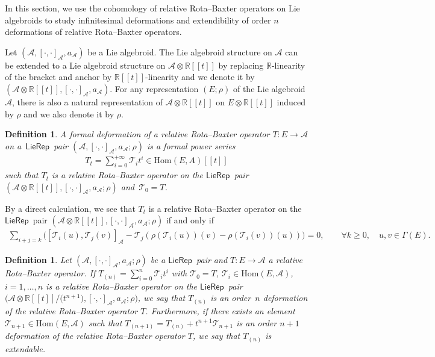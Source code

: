 \documentclass[10pt,a4paper]{amsart}
\numberwithin{equation}{section}
\newtheorem{defi}[thm]{Definition}
\newcommand{\Real}{\mathbb R}
\newcommand{\huaA}{\mathcal{A}}
\newcommand{\huaT}{\mathcal{T}}
\newcommand{\Hom}{\mathrm{Hom}}
\newcommand{\LP}{$\mathsf{LieRep}$~}
\begin{document}
In this section, we use the cohomology of relative Rota--Baxter operators on Lie algebroids to study infinitesimal deformations and extendibility of order $n$ deformations of relative Rota--Baxter operators.

Let $(\huaA,[\cdot,\cdot]_\huaA,a_\huaA)$ be a Lie algebroid. The Lie algebroid structure on $\huaA$ can be extended to a Lie algebroid structure on $\huaA\otimes \Real[[t]]$ by replacing $\Real$-linearity of the bracket and anchor by $\Real[[t]]$-linearity and we denote it by $(\huaA\otimes \Real[[t]],[\cdot,\cdot]_\huaA,a_\huaA)$. For any representation $(E;\rho)$ of the Lie algebroid $\huaA$, there is also a natural representation of $\huaA\otimes \Real[[t]]$ on $E\otimes \Real[[t]]$ induced by $\rho$ and we also denote it by $\rho$.


\begin{defi}%
 A {\it formal deformation} of a relative Rota--Baxter operator $T\colon E\longrightarrow \huaA$ on a~\LP pair $(\huaA,[\cdot,\cdot]_\huaA,a_\huaA;\rho)$ is a formal power series
 \begin{gather*}
 T_t=\sum_{i=0}^{+\infty}\huaT_it^i\in \Hom(E,A) [[t]]
 \end{gather*}
 such that $T_t$ is a relative Rota--Baxter operator on the \LP pair $(\huaA\otimes \Real[[t]],[\cdot,\cdot]_\huaA,a_\huaA;\rho)$ and~$\huaT_0=T$.
\end{defi}

By a direct calculation, we see that $T_t$ is a relative Rota--Baxter operator on the \LP pair $(\huaA\otimes \Real[[t]],[\cdot,\cdot]_\huaA,a_\huaA;\rho)$ if and only if
\begin{gather}\label{eq:equivalent form}
\sum_{i+j=k}\!\!\big([\huaT_i(u),\huaT_j(v)]_\huaA-\huaT_j(\rho(\huaT_i(u))(v)-\rho(\huaT_i(v))(u))\big)=0,
\qquad \forall k\geq0,\quad u,v\in\Gamma(E).\!\!
\end{gather}

\begin{defi}%
 Let $(\huaA,[\cdot,\cdot]_\huaA,a_\huaA;\rho)$ be a \LP pair and $T\colon E\longrightarrow \huaA$ a relative Rota--Baxter operator. If $T_{(n)}=\sum_{i=0}^{n}\huaT_it^i$ with $\huaT_0=T$, $\huaT_i\in\Hom(E,\huaA)$, $i=1,\dots,n$ is a relative Rota--Baxter operator on the \LP pair $\big(\huaA\otimes \Real[[t]]/\big(t^{n+1}\big),[\cdot,\cdot]_\huaA,a_\huaA;\rho\big)$, we say that $T_{(n)}$ is an {\it order~$n$ deformation} of the relative Rota--Baxter operator $T$. Furthermore, if there exists an element $\huaT_{n+1}\in \Hom(E,\huaA)$ such that $T_{(n+1)}=T_{(n)}+t^{n+1}\huaT_{n+1}$ is an order $n+1$ deformation of the relative Rota--Baxter operator $T$, we say that $T_{(n)}$ is {\it extendable}.
\end{defi}
\end{document}
